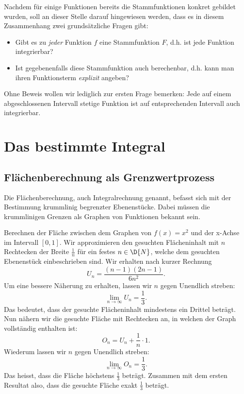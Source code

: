 \documentclass[%
11pt,%
twoside,%
titlepage,%
german,%
headsepline%
]{scrartcl}
\begin{document}
Nachdem für einige Funktionen bereits die Stammfunktionen konkret gebildet wurden, soll an dieser Stelle darauf hingewiesen werden, dass es in diesem Zusammenhang zwei grundsätzliche Fragen gibt:

\begin{itemize}
\item Gibt es zu \emph{jeder} Funktion $f$ eine Stammfunktion $F$, d.h. ist jede Funktion integrierbar?
\item Ist gegebenenfalls diese Stammfunktion auch berechenbar, d.h. kann man ihren Funk\-tions\-term \emph{explizit} angeben?
\end{itemize}

Ohne Beweis wollen wir lediglich zur ersten Frage bemerken: Jede auf einem abgeschlossenen Intervall stetige Funktion ist auf entsprechenden Intervall auch integrierbar.

\section{Das bestimmte Integral}
\subsection{Flächenberechnung als Grenzwertprozess}
Die
Flächenberechnung, auch Integralrechnung genannt, befasst sich mit der Bestimmung krummlinig begrenzter Ebenenstücke. Dabei müssen die krummlinigen Grenzen als Graphen von Funktionen bekannt sein.
\begin{bsp}
Berechnen der Fläche zwischen dem Graphen von $f(x)=x^2$ und der x-Achse im Intervall $[0,1]$. Wir approximieren den gesuchten Flächeninhalt mit $n$ Rechtecken der Breite $\frac{1}{n}$ für ein festes $n\in\D{N}$, welche dem gesuchten Ebenenstück einbeschrieben sind. Wir erhalten nach kurzer Rechnung
$$U_n=\frac{(n-1)(2n-1)}{6n^2}.$$
Um eine bessere Näherung zu erhalten, lassen wir $n$ gegen Unendlich streben:
$$\lim_{n\rightarrow\infty} U_n = \frac{1}{3}.$$
Das bedeutet, dass der gesuchte Flächeninhalt mindestens ein Drittel beträgt. Nun nähern wir die gesuchte Fläche mit Rechtecken an, in welchen der Graph vollständig enthalten ist:
$$O_n=U_n+\frac{1}{n}\cdot 1.$$
Wiederum lassen wir $n$ gegen Unendlich streben:
$$\lim_{n\rightarrow\infty} O_n = \frac{1}{3}.$$
Das heisst, dass die Fläche höchstens $\frac{1}{3}$ beträgt. Zusammen mit dem ersten Resultat also, dass die gesuchte Fläche exakt $\frac{1}{3}$ beträgt.
\end{bsp}
\end{document}
